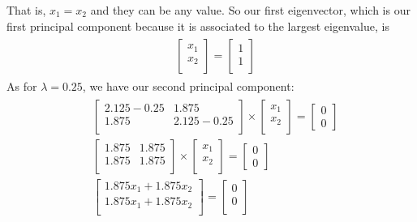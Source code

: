 \documentclass[leqno]{article}
\begin{document}
That is, $x_1 = x_2$ and they can be any value. So our first eigenvector, which is our first principal component because it is 
associated to the largest eigenvalue, is
\begin{gather*}
\begin{split}
&\begin{bmatrix}
    x_1 \\
    x_2  \\
\end{bmatrix} =
\begin{bmatrix} 
   1\\
   1\\
\end{bmatrix}
\end{split}
\end{gather*}
As for $\lambda = 0.25$, we have our second principal component:
\begin{gather*}
\begin{split}
&\begin{bmatrix}
    2.125 - 0.25 & 1.875 \\
    1.875 & 2.125 - 0.25\\  
\end{bmatrix} \times \begin{bmatrix}
   x_1\\
   x_2\\
\end{bmatrix} =
\begin{bmatrix}
   0\\
   0
\end{bmatrix}
\\
&\begin{bmatrix}
    1.875 & 1.875 \\
    1.875 & 1.875\\  
\end{bmatrix} \times \begin{bmatrix}
   x_1\\
   x_2\\
\end{bmatrix} =
\begin{bmatrix}
   0\\
   0
\end{bmatrix}
\\
&\begin{bmatrix}
    1.875x_1 + 1.875x_2 \\
    1.875x_1 + 1.875x_2\\  
\end{bmatrix} =
\begin{bmatrix}
   0\\
   0\\
\end{bmatrix}
\end{split}
\end{gather*}
\end{document}
